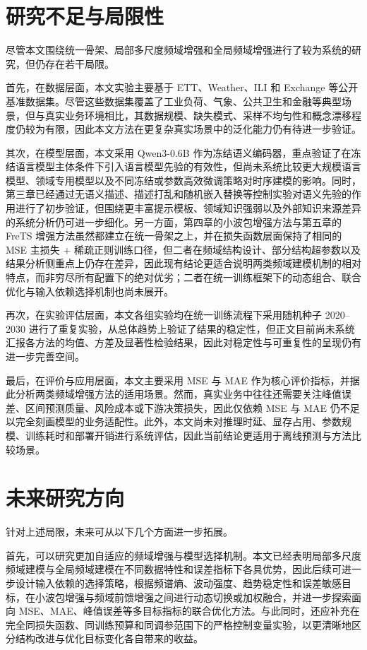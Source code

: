 \section{研究不足与局限性}
尽管本文围绕统一骨架、局部多尺度频域增强和全局频域增强进行了较为系统的研究，但仍存在若干局限。

首先，在数据层面，本文实验主要基于 ETT、Weather、ILI 和 Exchange 等公开基准数据集。尽管这些数据集覆盖了工业负荷、气象、公共卫生和金融等典型场景，但与真实业务环境相比，其数据规模、缺失模式、采样不均匀性和概念漂移程度仍较为有限，因此本文方法在更复杂真实场景中的泛化能力仍有待进一步验证。

其次，在模型层面，本文采用 Qwen3-0.6B 作为冻结语义编码器，重点验证了在冻结语言模型主体条件下引入语言模型先验的有效性，但尚未系统比较更大规模语言模型、领域专用模型以及不同冻结或参数高效微调策略对时序建模的影响。同时，第三章已经通过无语义描述、描述打乱和随机嵌入替换等控制实验对语义先验的作用进行了初步验证，但围绕更丰富提示模板、领域知识强弱以及外部知识来源差异的系统分析仍可进一步细化。另一方面，第四章的小波包增强方法与第五章的 FreTS 增强方法虽然都建立在统一骨架之上，并在损失函数层面保持了相同的 MSE 主损失 + 稀疏正则训练口径，但二者在频域结构设计、部分结构超参数以及结果分析侧重点上仍存在差异，因此现有结论更适合说明两类频域建模机制的相对特点，而非穷尽所有配置下的绝对优劣；二者在统一训练框架下的动态组合、联合优化与输入依赖选择机制也尚未展开。

再次，在实验评估层面，本文各组实验均在统一训练流程下采用随机种子 2020--2030 进行了重复实验，从总体趋势上验证了结果的稳定性，但正文目前尚未系统汇报各方法的均值、方差及显著性检验结果，因此对稳定性与可重复性的呈现仍有进一步完善空间。

最后，在评价与应用层面，本文主要采用 MSE 与 MAE 作为核心评价指标，并据此分析两类频域增强方法的适用场景。然而，真实业务中往往还需要关注峰值误差、区间预测质量、风险成本或下游决策损失，因此仅依赖 MSE 与 MAE 仍不足以完全刻画模型的业务适配性。此外，本文尚未对推理时延、显存占用、参数规模、训练耗时和部署开销进行系统评估，因此当前结论更适用于离线预测与方法比较场景。

\section{未来研究方向}
针对上述局限，未来可从以下几个方面进一步拓展。

首先，可以研究更加自适应的频域增强与模型选择机制。本文已经表明局部多尺度频域建模与全局频域建模在不同数据特性和误差指标下各具优势，因此后续可进一步设计输入依赖的选择策略，根据频谱熵、波动强度、趋势稳定性和误差敏感目标，在小波包增强与频域前馈增强之间进行动态切换或加权融合，并进一步探索面向 MSE、MAE、峰值误差等多目标指标的联合优化方法。与此同时，还应补充在完全同损失函数、同训练预算和同调参范围下的严格控制变量实验，以更清晰地区分结构改进与优化目标变化各自带来的收益。

